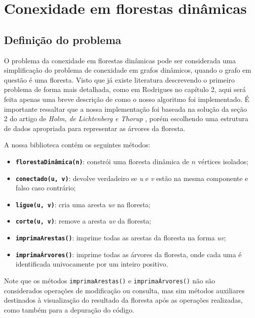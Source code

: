 
\chapter{Conexidade em florestas dinâmicas}

\section{Definição do problema}

O problema da conexidade em florestas dinâmicas pode ser considerada uma simplificação do problema de conexidade em grafos dinâmicos, quando o grafo em questão é uma floresta. Visto que já existe literatura descrevendo o primeiro problema de forma mais detalhada, como em Rodrigues \cite{arthur} no capítulo 2, aqui será feita apenas uma breve descrição de como o nosso algoritmo foi implementado. É importante ressaltar que a nossa implementação foi baseada na solução da seção 2 do artigo de \textit{Holm, de Lichtenberg e Thorup} \cite{jacob_holm}, porém escolhendo uma estrutura de dados apropriada para representar as árvores da floresta.

A nossa biblioteca contém os seguintes métodos:

\begin{itemize}
    \item \texttt{\textbf{florestaDinâmica(n)}}: constrói uma floresta dinâmica de $n$ vértices isolados;
    \item \texttt{\textbf{conectado(u, v)}}: devolve verdadeiro se \textit{u} e \textit{v} estão na mesma componente e falso caso contrário;
    \item \texttt{\textbf{ligue(u, v)}}: cria uma aresta \textit{uv} na floresta;
    \item \texttt{\textbf{corte(u, v)}}: remove a aresta \textit{uv} da floresta;
    \item \texttt{\textbf{imprimaArestas()}}: imprime todas as arestas da floresta na forma \textit{uv};
    \item \texttt{\textbf{imprimaÁrvores()}}: imprime todas as árvores da floresta, onde cada uma é identificada univocamente por um inteiro positivo.
\end{itemize}

Note que os métodos \texttt{imprimaArestas()} e \texttt{imprimaÁrvores()} não são considerados operações de modificação ou consulta, mas sim métodos auxiliares destinados à visualização do resultado da floresta após as operações realizadas, como também para a depuração do código.  

